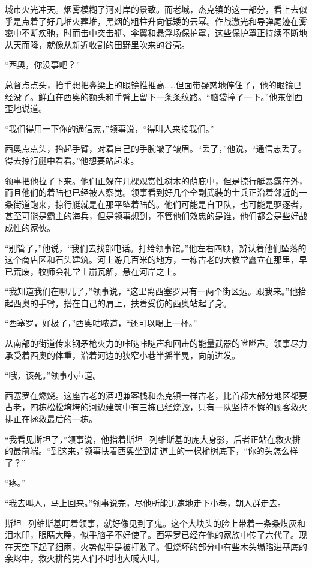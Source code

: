 \documentclass[AutoFakeBold=true]{book}
\begin{document}
城市火光冲天。烟雾模糊了河对岸的景致。而老城，杰克镇的这一部分，看上去似乎是点着了好几堆火葬堆，黑烟的粗柱升向低矮的云幂。作战激光和导弹尾迹在雾霭中不断疾驰，时而击中突击艇、伞翼和悬浮场保护罩，这些保护罩正持续不断地从天而降，就像从新近收割的田野里吹来的谷壳。

``西奥，你没事吧？''

总督点点头，抬手想把鼻梁上的眼镜推推高……但面带疑惑地停住了，他的眼镜已经没了。鲜血在西奥的额头和手臂上留下一条条纹路。``脑袋撞了一下。''他东倒西歪地说道。

``我们得用一下你的通信志，''领事说，``得叫人来接我们。''

西奥点点头，抬起手臂，对着自己的手腕皱了皱眉。``丢了，''他说，``通信志丢了。得去掠行艇中看看。''他想要站起来。

领事把他拉了下来。他们正躲在几棵观赏性树木的荫庇中，但是掠行艇暴露在外，而且他们的着陆也已经被人察觉。领事看到好几个全副武装的士兵正沿着邻近的一条街道跑来，掠行艇就是在那平坠着陆的。他们可能是自卫队，也可能是驱逐者，甚至可能是霸主的海兵，但是领事想到，不管他们效忠的是谁，他们都会是些好战成性的家伙。

``别管了，''他说，``我们去找部电话。打给领事馆。''他左右四顾，辨认着他们坠落的这个商店区和石头建筑。河上游几百米的地方，一栋古老的大教堂矗立在那里，早已荒废，牧师会礼堂土崩瓦解，悬在河岸之上。

``我知道我们在哪儿了，''领事说，``这里离西塞罗只有一两个街区远。跟我来。''他抬起西奥的手臂，搭在自己的肩上，扶着受伤的西奥站起了身。

``西塞罗，好极了，''西奥咕哝道，``还可以喝上一杯。''

从南部的街道传来钢矛枪火力的咔哒咔哒声和回击的能量武器的咝咝声。领事尽力承受着西奥的体重，沿着河边的狭窄小巷半摇半晃，向前进发。

\vspace*{1em}

``哦，该死。''领事小声道。

西塞罗在燃烧。这座古老的酒吧兼客栈和杰克镇一样古老，比首都大部分地区都要古老，四栋松松垮垮的河边建筑中有三栋已经烧毁，只有一队坚持不懈的顾客救火排正在拯救最后的一栋。

``我看见斯坦了，''领事说，他指着斯坦·列维斯基的庞大身影，后者正站在救火排的最前端。``到这来，''领事扶着西奥坐到走道上的一棵榆树底下，``你的头怎么样了？''

``疼。''

``我去叫人，马上回来。''领事说完，尽他所能迅速地走下小巷，朝人群走去。

斯坦·列维斯基盯着领事，就好像见到了鬼。这个大块头的脸上带着一条条煤灰和泪水印，眼睛大睁，似乎脑子不好使了。西塞罗已经在他的家族中传了六代了。现在天空下起了细雨，火势似乎是被打败了。但烧坏的部分中有些木头塌陷进基底的余烬中，救火排的男人们不时地大喊大叫。
\end{document}
